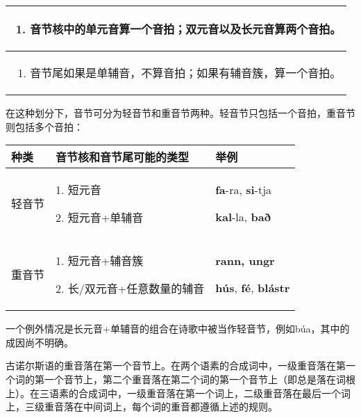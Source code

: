 \begin{longtable}{l}
  \toprule
  \begin{enumerate}\def\labelenumi{\arabic{enumi}.}\item  音节核中的单元音算一个音拍；双元音以及长元音算两个音拍。\end{enumerate} \\
  \midrule
  \endhead
  \bottomrule
  \endfoot
  \begin{minipage}[t]{\linewidth}\raggedright
    \begin{enumerate}
      \def\labelenumi{\arabic{enumi}.}
      \setcounter{enumi}{1}
      \item
            音节尾如果是单辅音，不算音拍；如果有辅音簇，算一个音拍。
    \end{enumerate}
  \end{minipage}                                                                                               \\
\end{longtable}

在这种划分下，音节可分为轻音节和重音节两种。轻音节只包括一个音拍，重音节则包括多个音拍：

\begin{longtable}{lll}
  \toprule
  种类                        & 音节核和音节尾可能的类型        & 举例 \\
  \midrule
  \endhead
  \bottomrule
  \endfoot
  轻音节                      & 1. 短元音

  2. 短元音+单辅音            & \textbf{fa}-ra, \textbf{si}-tja

  \textbf{kal}-la, \textbf{bað}                                        \\
  重音节                      & 1. 短元音+辅音簇

  2. 长/双元音+任意数量的辅音 & \textbf{rann, ungr}

  \textbf{hús}, \textbf{fé}, \textbf{blástr}                           \\
\end{longtable}

一个例外情况是长元音+单辅音的组合在诗歌中被当作轻音节，例如búa，其中的成因尚不明确。

古诺尔斯语的重音落在第一个音节上。在两个语素的合成词中，一级重音落在第一个词的第一个音节上，第二个重音落在第二个词的第一个音节上（即总是落在词根上）。在三语素的合成词中，一级重音落在第一个词上，二级重音落在最后一个词上，三级重音落在中间词上，每个词的重音都遵循上述的规则。


